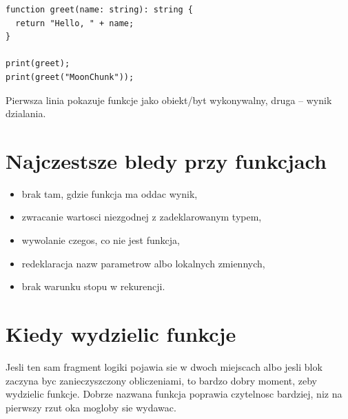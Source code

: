 \begin{lstlisting}[style=moonchunk,caption={Wypisanie obiektu funkcji i wyniku jej wywolania}]
function greet(name: string): string {
  return "Hello, " + name;
}

print(greet);
print(greet("MoonChunk"));
\end{lstlisting}

Pierwsza linia pokazuje funkcje jako obiekt/byt wykonywalny, druga -- wynik dzialania.

\section{Najczestsze bledy przy funkcjach}
\begin{itemize}
  \item brak  tam, gdzie funkcja ma oddac wynik,
  \item zwracanie wartosci niezgodnej z zadeklarowanym typem,
  \item wywolanie czegos, co nie jest funkcja,
  \item redeklaracja nazw parametrow albo lokalnych zmiennych,
  \item brak warunku stopu w rekurencji.
\end{itemize}

\section{Kiedy wydzielic funkcje}
Jesli ten sam fragment logiki pojawia sie w dwoch miejscach albo jesli blok 
zaczyna byc zanieczyszczony obliczeniami, to bardzo dobry moment, zeby wydzielic funkcje.
Dobrze nazwana funkcja poprawia czytelnosc bardziej, niz na pierwszy rzut oka mogloby
sie wydawac.
